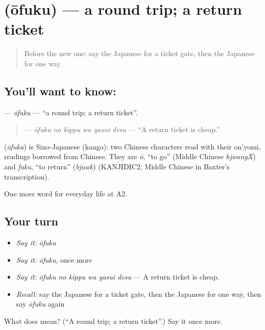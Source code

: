 \section[\texorpdfstring{\ja{おうふく} (ōfuku)}{おうふく (ōfuku)}]{ (ōfuku) — a round trip; a return ticket}

\label{lesson:JA-C205-oufuku}



\begin{quote}
Before the new one: say the Japanese for a ticket gate, then the Japanese for one way.
\end{quote}

\subsection*{You'll want to know: }
\textbf{} — \emph{ōfuku} — \textquotedblleft{}a round trip; a return ticket\textquotedblright{}.

\begin{quote}
\textbf{  } — \emph{ōfuku no kippu wa yasui desu} — \textquotedblleft{}A return ticket is cheap.\textquotedblright{}
\end{quote}

\begin{cousinweb}
\textbf{} (\emph{ōfuku}) is Sino-Japanese (kango): two Chinese characters read with their on'yomi, readings borrowed from Chinese. They are \emph{ō}, \textquotedblleft{}to go\textquotedblright{} (Middle Chinese \emph{hjwangX}) and \emph{fuku}, \textquotedblleft{}to return\textquotedblright{} (\emph{bjuwk}) (KANJIDIC2; Middle Chinese in Baxter's transcription).
\end{cousinweb}

\begin{grammarlens}[title={What you've built}]
One more word for everyday life at A2.
\end{grammarlens}

\subsection*{Your turn}
\begin{itemize}
\raggedright
  \item \emph{Say it:} \emph{ōfuku}
  \item \emph{Say it:} \emph{ōfuku}, once more
  \item \emph{Say it:} \emph{ōfuku no kippu wa yasui desu} — A return ticket is cheap.
  \item \emph{Recall:} say the Japanese for a ticket gate, then the Japanese for one way, then say \emph{ōfuku} again
\end{itemize}

\begin{tcolorbox}[breakable,colback=teal!4,colframe=teal!35!black,title={Before you move on}]
What does  mean? (\textquotedblleft{}A round trip; a return ticket\textquotedblright{}.) Say it once more.
\end{tcolorbox}
